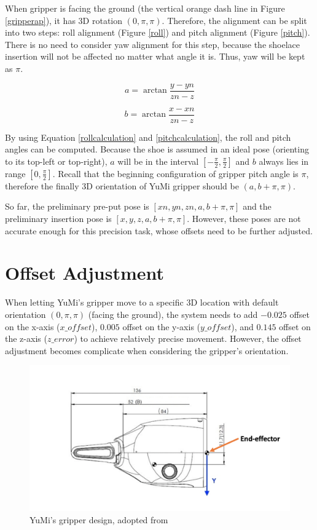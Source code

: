 When gripper is facing the ground (the vertical orange dash line in Figure \ref{gripperap}), it has 3D rotation $(0, \pi, \pi)$. Therefore, the alignment can be split into two steps: roll alignment (Figure \ref{roll}) and pitch alignment (Figure \ref{pitch}). There is no need to consider yaw alignment for this step, because the shoelace insertion will not be affected no matter what angle it is. Thus, yaw will be kept as $\pi$.

\begin{equation}
a = \arctan \frac{y - yn}{zn - z}
\label{rollcalculation}
\end{equation}

\begin{equation}
b = \arctan \frac{x - xn}{zn - z}
\label{pitchcalculation}
\end{equation}

By using Equation \ref{rollcalculation} and \ref{pitchcalculation}, the roll and pitch angles can be computed. Because the shoe is assumed in an ideal pose (orienting to its top-left or top-right), $a$ will be in the interval $[-\frac{\pi}{2}, \frac{\pi}{2}]$ and $b$ always lies in range $[0, \frac{\pi}{2}]$. Recall that the beginning configuration of gripper pitch angle is $\pi$, therefore the finally 3D orientation of YuMi gripper should be $(a, b + \pi, \pi)$. 

So far, the preliminary pre-put pose is $[xn, yn, zn, a, b + \pi, \pi]$ and the preliminary insertion pose is $[x, y, z, a, b + \pi, \pi]$. However, these poses are not accurate enough for this precision task, whose offsets need to be further adjusted.

\section{Offset Adjustment} \label{offsetadjustment}
When letting YuMi's gripper move to a specific 3D location with default orientation $(0, \pi, \pi)$ (facing the ground), the system needs to add $-0.025$ offset on the x-axis ($x\_offset$), $0.005$ offset on the y-axis ($y\_offset$), and $0.145$ offset on the z-axis ($z\_error$) to achieve relatively precise movement. However, the offset adjustment becomes complicate when considering the gripper's orientation.

\begin{figure}[H]
\centering
\includegraphics[width = 0.8\columnwidth]{Implementation/mp/gripperoffset.png}
\caption{YuMi's gripper design, adopted from \citep{Productspecification}}
\label{gripperoffset}
\end{figure}

